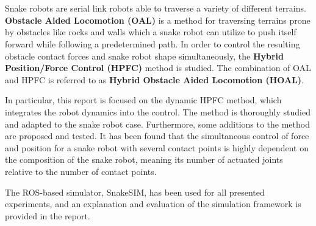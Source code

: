 \chapter{\abstractname}


Snake robots are serial link robots able to traverse a variety of different terrains. 
\textbf{Obstacle Aided Locomotion (OAL)} is a method for traversing terrains prone by obstacles like rocks and walls which a snake robot can utilize to push itself forward while following a predetermined path. In order to control the resulting obstacle contact forces and snake robot shape simultaneously, the \textbf{Hybrid Position/Force Control (HPFC)} method is studied. The combination of OAL and HPFC is referred to as \textbf{Hybrid Obstacle Aided Locomotion (HOAL)}.

In particular, this report is focused on the dynamic HPFC method, which integrates the robot dynamics into the control. The method is thoroughly studied and adapted to the snake robot case. Furthermore, some additions to the method are proposed and tested. It has been found that the simultaneous control of force and position for a snake robot with several contact points is highly dependent on the composition of the snake robot, meaning its number of actuated joints relative to the number of contact points. 

The ROS-based simulator, SnakeSIM, has been used for all presented experiments, and an explanation and evaluation of the simulation framework is provided in the report.


\makeatletter
{}


\makeatother







